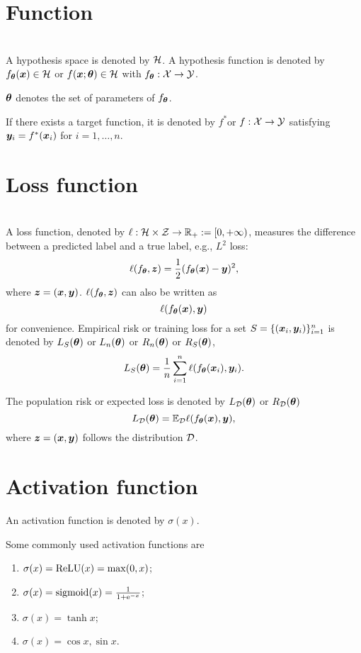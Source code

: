 \documentclass{article}
\begin{document}
\section{Function}~\\
A hypothesis space is denoted by $\mathcal{H}$. A hypothesis function is denoted by $f_{\bm{\theta}}(\bm{x})\in\mathcal{H}$ or $f(\bm{x};\bm{\theta})\in\mathcal{H}$ with $f_{\bm{\theta}}:\mathcal{X}\to\mathcal{Y}$.

$\bm{\theta}$  denotes the set of parameters of  $f_{\bm{\theta}}$.  

If there exists a target function, it is denoted by $f^*$or $f:\mathcal{X}\to\mathcal{Y}$ satisfying $\bm{y}_i=f^*(\bm{x}_i)$ for $i=1,\ldots,n$.

\section{Loss function}~\\
A loss function, denoted by $\ell:\mathcal{H}\times\mathcal{Z}\to\mathbb{R}_+:=[0,+\infty)$, measures the difference between a predicted label and a true label, e.g., $L^2$ loss: 
\[
\ell(f_{\bm{\theta}},\bm{z})=\frac{1}{2}(f_{\bm{\theta}}(\bm{x})-\bm{y})^2,
\]
 where $\bm{z}=(\bm{x},\bm{y})$. $\ell(f_{\bm{\theta}},\bm{z})$ can also be written as 
\[
\ell(f_{\bm{\theta}}(\bm{x}),\bm{y})
\]
 for convenience.
Empirical risk or training loss for a set $S=\{(\bm{x}_i,\bm{y}_i)\}_{i=1}^{n}$ is denoted by   $L_S(\bm{\theta})$ or $L_{n}(\bm{\theta})$ or $R_{n}(\bm{\theta})$ or $R_{S}(\bm{\theta})$,
\begin{equation}
    L_S(\bm{\theta}) =\frac{1}{n}\sum_{i=1}^n\ell(f_{\bm{\theta}}(\bm{x}_i),\bm{y}_i).
\end{equation}


The population risk or expected loss is denoted by $L_{\mathcal{D}}(\bm{\theta})$ or $R_{\mathcal{D}}(\bm{\theta})$
\begin{equation}
    L_{\mathcal{D}}(\bm{\theta}) =\mathbb{E}_{\mathcal{D}}\ell(f_{\bm{\theta}}(\bm{x}),\bm{y}),
\end{equation}
where $\bm{z}=(\bm{x},\bm{y})$ follows the distribution $\mathcal{D}$.

\section{Activation function}
An activation function is denoted by $\sigma(x)$. 
\begin{exam}Some commonly used activation functions are~\\
    \begin{enumerate}
        \item $\sigma(x) = \mathrm{ReLU} (x) = \max (0, x)$;
        \item $\sigma(x) ={\rm sigmoid}(x)= \frac{1}{1 + \mathrm{e}^{-x}}$;
        \item $\sigma(x) = \tanh x$;
        \item $\sigma(x) = \cos x, \sin x$.
    \end{enumerate}
\end{exam}
\end{document}
